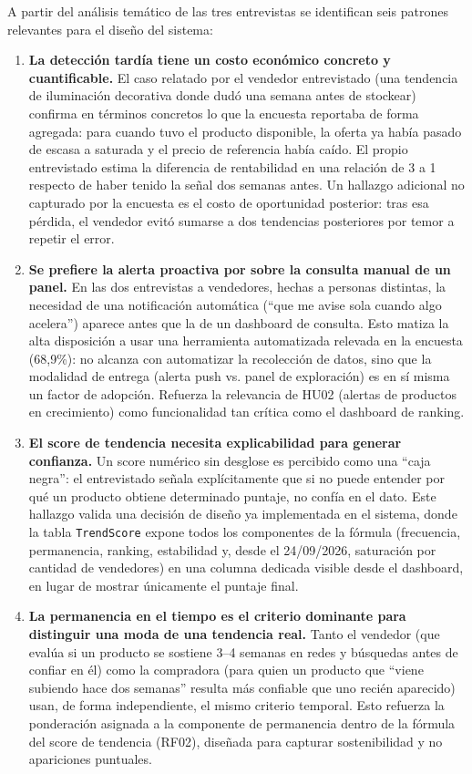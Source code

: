 A partir del análisis temático de las tres entrevistas se identifican seis patrones relevantes para el diseño del sistema:

\begin{enumerate}
	\item \textbf{La detección tardía tiene un costo económico concreto y cuantificable.} El caso relatado por el vendedor entrevistado (una tendencia de iluminación decorativa donde dudó una semana antes de stockear) confirma en términos concretos lo que la encuesta reportaba de forma agregada: para cuando tuvo el producto disponible, la oferta ya había pasado de escasa a saturada y el precio de referencia había caído. El propio entrevistado estima la diferencia de rentabilidad en una relación de 3 a 1 respecto de haber tenido la señal dos semanas antes. Un hallazgo adicional no capturado por la encuesta es el costo de oportunidad posterior: tras esa pérdida, el vendedor evitó sumarse a dos tendencias posteriores por temor a repetir el error.
	\item \textbf{Se prefiere la alerta proactiva por sobre la consulta manual de un panel.} En las dos entrevistas a vendedores, hechas a personas distintas, la necesidad de una notificación automática (``que me avise sola cuando algo acelera'') aparece antes que la de un dashboard de consulta. Esto matiza la alta disposición a usar una herramienta automatizada relevada en la encuesta (68,9\%): no alcanza con automatizar la recolección de datos, sino que la modalidad de entrega (alerta push vs. panel de exploración) es en sí misma un factor de adopción. Refuerza la relevancia de HU02 (alertas de productos en crecimiento) como funcionalidad tan crítica como el dashboard de ranking.
	\item \textbf{El score de tendencia necesita explicabilidad para generar confianza.} Un score numérico sin desglose es percibido como una ``caja negra'': el entrevistado señala explícitamente que si no puede entender por qué un producto obtiene determinado puntaje, no confía en el dato. Este hallazgo valida una decisión de diseño ya implementada en el sistema, donde la tabla \texttt{TrendScore} expone todos los componentes de la fórmula (frecuencia, permanencia, ranking, estabilidad y, desde el 24/09/2026, saturación por cantidad de vendedores) en una columna dedicada visible desde el dashboard, en lugar de mostrar únicamente el puntaje final.
	\item \textbf{La permanencia en el tiempo es el criterio dominante para distinguir una moda de una tendencia real.} Tanto el vendedor (que evalúa si un producto se sostiene 3--4 semanas en redes y búsquedas antes de confiar en él) como la compradora (para quien un producto que ``viene subiendo hace dos semanas'' resulta más confiable que uno recién aparecido) usan, de forma independiente, el mismo criterio temporal. Esto refuerza la ponderación asignada a la componente de permanencia dentro de la fórmula del score de tendencia (RF02), diseñada para capturar sostenibilidad y no apariciones puntuales.

\end{enumerate}
